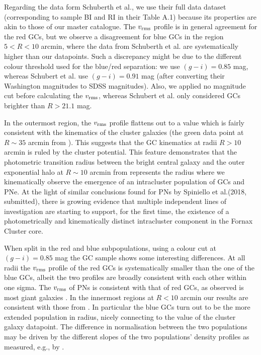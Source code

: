 \documentclass[usenatbib]{mnras}
\begin{document}
Regarding the data form Schuberth et al., we use their full data dataset (corresponding to 
sample BI and RI in their Table A.1) because its properties are akin to those of our master catalogue.
The $v_{\rm rms}$ profile is in general agreement for the red GCs, but we
observe a disagreement for blue GCs in the region $5<R<10$ arcmin, where the data from 
Schuberth et al. are systematically higher than our datapoints. Such a discrepancy
might be due to the different colour threshold used for the blue/red separation: we
use $(g-i) = 0.85$ mag, whereas Schubert et al. use $(g-i) = 0.91$ mag (after converting
their Washington magnitudes to SDSS magnitudes). Also, we applied no magnitude cut before
calculating the $v_{\rm rms}$, whereas Schubert et al. only considered GCs brighter than $R>21.1$ mag.

In the outermost region, the $v_{\rm rms}$ profile flattens out to a value which is 
fairly consistent with the kinematics of the cluster galaxies (the green data 
point at $R\sim35$ arcmin from \citealt{Drinkwater00}). This suggests that the GC 
kinematics at radii $R>10$ arcmin is ruled by the cluster potential. 
This feature demonstrates that the photometric transition radius 
between the bright central galaxy and the outer exponential halo at $R\sim10$ 
arcmin from \citet{Iodice16} represents the radius where we kinematically observe the 
emergence of an intracluster population of GCs and PNe. 
At the light of similar conclusions found for PNs by Spiniello et al.(2018, submitted), 
there is  growing evidence that multiple independent lines of investigation 
are starting to support, for the first time, the existence of a photometrically 
and kinematically distinct intracluster component in the Fornax Cluster core.

When split in the red and blue subpopulations, using a colour cut at $(g - i) = 0.85$ mag 
the GC sample shows some interesting differences. At all radii the $v_{\rm rms}$ 
profile of the red GCs is systematically smaller than the one of the blue GCs, 
albeit the two profiles are broadly consistent with each other within one sigma. 
The $v_{\rm rms}$ of PNs is consistent with that of red GCs, as observed is 
most giant galaxies \citep[e.g.,][]{Pota13}.
In the innermost regions at $R < 10$ arcmin our results are consistent with  
those from \citet{Schuberth}. In particular the blue GCs turn out to 
be the more extended population in radius, nicely connecting to the value of 
the cluster galaxy datapoint. The difference in normalisation between the two 
populations may be driven by the different slopes of the two 
populations' density profiles as measured, e.g., by 
\citet[][their Eq. 10 and 11 and Table 5]{Schuberth}. 
\end{document}

